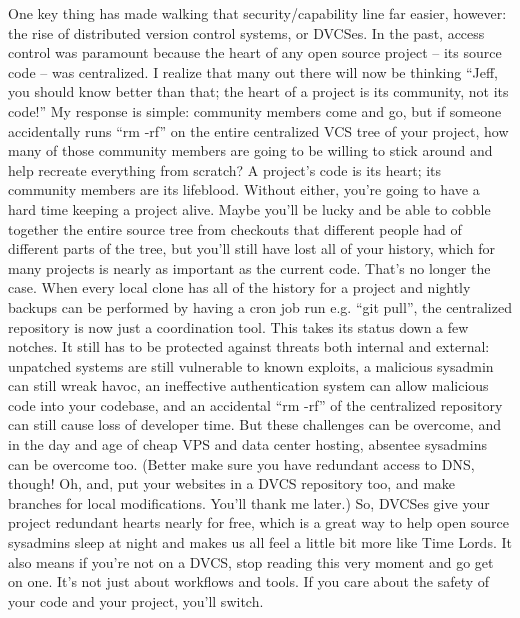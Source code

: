 One key thing has made walking that security/capability line far easier,
however: the rise of distributed version control systems, or DVCSes.
In the past, access control was paramount because the heart of any open source
project -- its source code -- was centralized. I realize that many out there
will now be thinking “Jeff, you should know better than that; the heart of a
project is its community, not its code!” My response is simple: community
members come and go, but if someone accidentally runs “rm -rf” on the entire
centralized VCS tree of your project, how many of those community members are
going to be willing to stick around and help recreate everything from scratch? A
project’s code is its heart; its community members are its lifeblood. Without
either, you’re going to have a hard time keeping a project alive. Maybe you’ll
be lucky and be able to cobble together the entire source tree from checkouts
that different people had of different parts of the tree, but you’ll still have
lost all of your history, which for many projects is nearly as important as the
current code.
That’s no longer the case. When every local clone has all of the history for a
project and nightly backups can be performed by having a cron job run e.g. “git
pull”, the centralized repository is now just a coordination tool. This takes
its status down a few notches. It still has to be protected against threats both
internal and external: unpatched systems are still vulnerable to known exploits,
a malicious sysadmin can still wreak havoc, an ineffective authentication system
can allow malicious code into your codebase, and an accidental “rm -rf” of the
centralized repository can still cause loss of developer time. But these
challenges can be overcome, and in the day and age of cheap VPS and data center
hosting, absentee sysadmins can be overcome too. (Better make sure you have
redundant access to DNS, though! Oh, and, put your websites in a DVCS repository
too, and make branches for local modifications. You’ll thank me later.)
So, DVCSes give your project redundant hearts nearly for free, which is a great
way to help open source sysadmins sleep at night and makes us all feel a little
bit more like Time Lords. It also means if you’re not on a DVCS, stop reading
this very moment and go get on one. It’s not just about workflows and tools. If
you care about the safety of your code and your project, you’ll switch.

